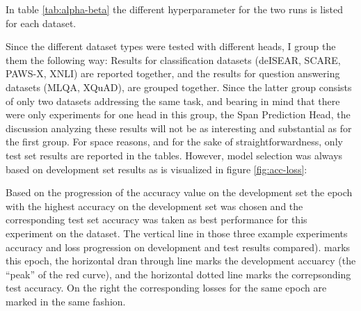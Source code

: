 In table \ref{tab:alpha-beta}
the different hyperparameter for the two runs is listed for each dataset.


Since the different dataset types were tested with different heads, I group the them
the following way: Results for classification datasets (deISEAR, SCARE, PAWS-X, XNLI)
are reported together, and the results for question answering datasets (MLQA, XQuAD),
are grouped together. Since the latter group consists of only two datasets addressing
the same task, and bearing in mind that there were only experiments for one head in
this group, the Span Prediction Head, the discussion analyzing these results will not
be as interesting and substantial as for the first group. For space reasons, and for
the sake of straightforwardness, only test set results are reported in the tables.
However, model selection was always based on development set results as is visualized
in figure \ref{fig:acc-loss}:

Based on the progression of the accuracy value on the development set the epoch with
the highest accuracy on the development set was chosen and the corresponding test set
accuracy was taken as best performance for this experiment on the dataset. The vertical
line in those three example experiments accuracy and loss progression on development and
test results compared). marks this epoch, the horizontal dran through line marks the
development accuarcy (the ``peak'' of the red curve), and the horizontal dotted line
marks the correpsonding test accuracy. On the right the corresponding losses for the
same epoch are marked in the same fashion.

